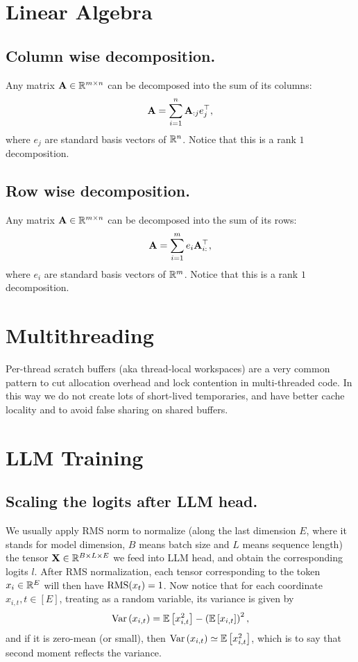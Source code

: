 \documentclass[11pt]{article}  %
\begin{document}
\tableofcontents

\section{Linear Algebra}


\subsection{Column wise decomposition.}
Any matrix $\mathbf{A} \in \mathbb{R}^{m \times n}$ can be decomposed into the sum of its columns: 
\begin{align}
	\mathbf{A} = \sum_{i=1}^{n} \mathbf{A}_{:j} e_j^{\top},
\end{align}
where $e_j$ are standard basis vectors of $\mathbb{R}^n$.
Notice that this is a rank $1$ decomposition.

\subsection{Row wise decomposition.}
Any matrix $\mathbf{A} \in \mathbb{R}^{m \times n}$ can be decomposed into the sum of its rows: 
\begin{align}
	\mathbf{A} = \sum_{i=1}^{m} e_i \mathbf{A}_{i:}^{\top},
\end{align}
where $e_i$ are standard basis vectors of $\mathbb{R}^m$.
Notice that this is a rank $1$ decomposition.


\section{Multithreading}
Per-thread scratch buffers (aka thread-local workspaces) are a very common pattern to cut allocation overhead and lock contention in multi-threaded code.
In this way we do not create lots of short-lived temporaries, and have better cache locality and to avoid false sharing on shared buffers.


\section{LLM Training}
\subsection{Scaling the logits after LLM head.}
We usually apply RMS norm to normalize (along the last dimension $E$, where it stands for model dimension, $B$ means batch size and $L$ means sequence length) the tensor $\mathbf{X} \in \mathbb{R}^{B \times L \times E}$ we feed into LLM head, and obtain the corresponding logits $l$.
After RMS normalization, each tensor corresponding to the token $x_i \in \mathbb{R}^E$ will then have ${\rm RMS}(x_t) = 1$.
Now notice that for each coordinate $x_{i, t}, t\in[E]$, treating as a random variable, its variance is given by 
\begin{align}
  \operatorname{Var}\left( x_{i, t} \right) = \mathbb{E}\left[x^2_{i, t}\right] - \left( \mathbb{E}\left[x_{i, t}\right] \right)^2,
\end{align}
and if it is zero-mean (or small), then $\operatorname{Var}\left( x_{i, t} \right) \simeq \mathbb{E}\left[x^2_{i, t}\right]$, which is to say that second moment reflects the variance.
\end{document}
